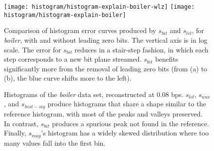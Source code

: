 \begin{figure}[h]
	\centering
	{\texttt{[image: histogram/histogram-explain-boiler-wlz]}}
	{\texttt{[image: histogram/histogram-explain-boiler]}} \caption{Comparison
	of histogram error curves produced by $s_{bit}$ and $s_{lvl}$, for \emph{boiler}, with and without
	leading zero bits. The vertical axis is in log scale. The error for $s_{bit}$ reduces in a
	stair-step fashion, in which each step corresponds to a new bit plane streamed. $s_{bit}$ benefits
	significantly more from the removal of leading zero bits (from (a) to (b), the blue curve shifts
	more to the left).}
	\label{fig:histogram-explain}
\end{figure}

\begin{figure}[h]
	\centering
	\caption{Histograms of the \emph{boiler} data set, reconstructed at 0.08 bps. $s_{lvl}$,
	$s_{wav}$, and $s_{hist-sig}$ produce histograms that share a shape similar to the reference histogram,
	with most of the peaks and valleys preserved. In contrast, $s_{bit}$ produces a spurious peak not
	found in the reference. Finally, $s_{mag}$'s histogram has a widely skewed distribution where too
	many values fall into the first bin.}
	\label{fig:histograms-boiler}
\end{figure}
